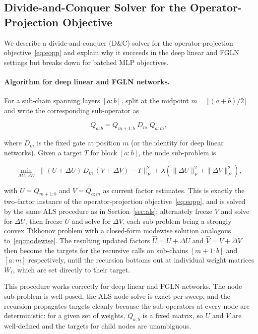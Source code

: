 \documentclass{article}
\begin{document}
\subsection{Divide-and-Conquer Solver for the Operator-Projection Objective}
\label{app:dnc}

We describe a divide-and-conquer (D\&C) solver for the operator-projection
objective~\eqref{eq:eopp} and explain why it succeeds in the deep linear
and FGLN settings but breaks down for batched MLP objectives.

\paragraph{Algorithm for deep linear and FGLN networks.}
For a sub-chain spanning layers $[a:b]$, split at the midpoint
$m = \lfloor(a+b)/2\rfloor$ and write the corresponding sub-operator as

\[
Q_{a:b} = Q_{m+1:b}\; D_m\; Q_{a:m},
\]

where $D_m$ is the fixed gate at position $m$ (or the identity for deep linear
networks). Given a target $T$ for block $[a:b]$, the node sub-problem is

\[
    \min_{\Delta U,\, \Delta V}
    \;\|(U + \Delta U)\,D_m\,(V + \Delta V) - T\|_F^2
    + \lambda (\|\Delta U\|_F^2 + \|\Delta V\|_F^2),
\]

with $U = Q_{m+1:b}$ and $V = Q_{a:m}$ as current factor estimates.
This is exactly the two-factor instance of the operator-projection
objective~\eqref{eq:eopp}, and is solved by the same ALS procedure
as in Section~\ref{sec:als}: alternately freeze $V$ and solve for $\Delta U$,
then freeze $U$ and solve for $\Delta V$, each sub-problem being a strongly
convex Tikhonov problem with a closed-form modewise solution analogous
to~\eqref{eq:modewise}.
The resulting updated factors $\hat U = U + \Delta U$ and $\hat V = V + \Delta V$
then become the targets for the recursive calls on sub-chains $[m+1:b]$ and
$[a:m]$ respectively, until the recursion bottoms out at individual weight
matrices $W_\ell$, which are set directly to their target.

This procedure works correctly for deep linear and FGLN networks.
The node sub-problem is well-posed, the ALS node solve is exact
per sweep, and the recursion propagates targets cleanly because
the sub-operators at every node are deterministic: for a given set of
weights, $Q_{a:b}$ is a fixed matrix, so $U$ and $V$ are well-defined
and the targets for child nodes are unambiguous.
\end{document}
